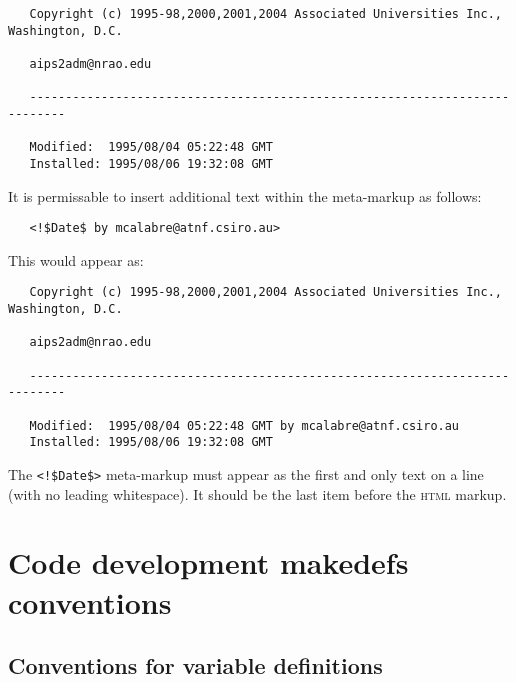 \begin{verbatim}
   Copyright (c) 1995-98,2000,2001,2004 Associated Universities Inc., Washington, D.C.

   aips2adm@nrao.edu

   ---------------------------------------------------------------------------

   Modified:  1995/08/04 05:22:48 GMT
   Installed: 1995/08/06 19:32:08 GMT
\end{verbatim}

\noindent
It is permissable to insert additional text within the meta-markup as follows:

\noindent
\verb+   <!$+\verb+Date$ by mcalabre@atnf.csiro.au>+

\noindent
This would appear as:

\begin{verbatim}
   Copyright (c) 1995-98,2000,2001,2004 Associated Universities Inc., Washington, D.C.

   aips2adm@nrao.edu

   ---------------------------------------------------------------------------

   Modified:  1995/08/04 05:22:48 GMT by mcalabre@atnf.csiro.au
   Installed: 1995/08/06 19:32:08 GMT
\end{verbatim}

\noindent
The \verb+<!$+\verb+Date$>+ meta-markup must appear as the first and only text
on a line (with no leading whitespace).  It should be the last item before the
 \textsc{html} markup.


\newpage
\section{Code development makedefs conventions}
\label{Code development makedefs conventions}

\subsection*{Conventions for  variable definitions}

